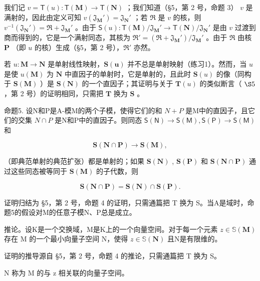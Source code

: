 我们记 \(v = \mathsf{T}(u) \colon \mathsf{T}(\mathbf{M}) \to \mathsf{T}(\mathbf{N})\) ；我们知道（§5，第 2 号，命题 3） \(v\) 是满射的，因此由定义可知 \(v(\mathfrak{J}_{\mathbf{M}}') = \mathfrak{J}_{\mathbf{N}}'\) ；若 \(\Re\) 是 \(v\) 的核，则 \(v^{-1}(\mathfrak{J}_{\mathbf{N}}') = \Re + \mathfrak{J}_{\mathbf{M}}'\) 。由于 \(\mathsf{S}(u) \colon \mathsf{T}(\mathbf{M}) / \mathfrak{J}_{\mathbf{M}}' \to \mathsf{T}(\mathbf{N}) / \mathfrak{J}_{\mathbf{N}}'\) 是由 \(v\) 过渡到商而得到的，它是一个满射同态，其核为 \(\Re' = (\Re + \mathfrak{J}_{\mathbf{M}}') / \mathfrak{J}_{\mathbf{M}}'\) 。由于 \(\Re\) 由核 \(\mathbf{P}\) （即 \(u\) 的核）生成（§5，第 2 号），\(\Re'\) 亦然。

若 \(u: \mathbf{M} \to \mathbf{N}\) 是单射线性映射，\(\mathbf{S}(\mathbf{u})\) 并不总是单射映射（练习1）。然而，当 \(u\) 是使 \(u(\mathbf{M})\) 为 \(\mathbf{N}\) 中直因子的单射时，它是单射的，且此时 \(\mathbf{S}(u)\) 的像（同构于 \(\mathbf{S}(\mathbf{M})\) ）是 \(\mathbf{S}(\mathbf{N})\) 的一个直因子；其证明与关于 \(\mathbf{T}(u)\) 的类似断言（ \(\S 5\) ，第 2 号）的证明相同，只需把 \(\mathbf{T}\) 换为 \(\mathbf{S}\) 。

命题5. 设N和P是A-模M的两个子模，使得它们的和 \(N + P\) 是M中的直因子，且它们的交集 \(N \cap P\) 是N和P中的直因子。则同态 \(\mathsf{S}(\mathsf{N}) \to \mathsf{S}(\mathsf{M}), \mathsf{S}(\mathsf{P}) \to \mathsf{S}(\mathsf{M})\) 和

\[
\mathbf {S} (\mathbf {N} \cap \mathbf {P}) \rightarrow \mathbf {S} (\mathbf {M}),
\]

（即典范单射的典范扩张）都是单射的；如果 \(\mathbf{S}(\mathbf{N})\) , \(\mathbf{S}(\mathbf{P})\) 和 \(\mathbf{S}(\mathbf{N} \cap \mathbf{P})\) 通过这些同态被等同于 \(\mathbf{S}(\mathbf{M})\) 的子代数，则

\[
\mathbf {S} (\mathbf {N} \cap \mathbf {P}) = \mathbf {S} (\mathbf {N}) \cap \mathbf {S} (\mathbf {P}).\tag{4}
\]

证明归结为 §5，第 2 号，命题 4 的证明，只需通篇把 T 换为 S。当A是域时，命题5的假设对M的任意子模N、P总是成立。

推论。设K是一个交换域，M是K上的一个向量空间。对于每一个元素 \(z \in \mathbb{S}(\mathbf{M})\) 存在 M 的一个最小向量子空间 N，使得 \(z \in \mathbb{S}(\mathbf{N})\) 且N是有限维的。

证明的推导源自 §5，第 2 号，命题 4 的推论，只需通篇把 T 换为 S。

N 称为 M 的与 z 相关联的向量子空间。

